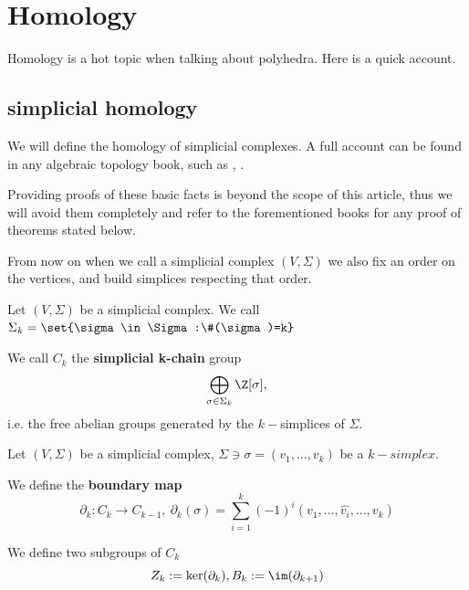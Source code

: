 \section{Homology}

Homology is a hot topic when talking about polyhedra.
Here is a quick account.

\subsection{simplicial homology}
We will define the homology of simplicial complexes. 
A full account can be found in any algebraic topology book, such as \cite{at1}, \cite{at2}.

Providing proofs of these basic facts is beyond the scope of this article, thus we will avoid them completely and 
refer to the forementioned books for any proof of theorems stated below. 

From now on when we call a simplicial complex $(V,\Sigma)$ we also fix an order on the vertices, and build simplices respecting that order.

\begin{definition}\hfill 

Let $(V,\Sigma)$ be a simplicial complex. We call $\Sigma_k=\set{\sigma\in \Sigma:\#(\sigma)=k}$

We call $C_k$ the \textbf{simplicial k-chain} group 
\[\bigoplus_{\sigma\in \Sigma_k}\Z [\sigma],\]
i.e. the free abelian groups generated by the $k-$simplices of $\Sigma$.
\end{definition}

\begin{definition}\hfill

Let $(V,\Sigma)$ be a simplicial complex, $\Sigma\ni\sigma=(v_1,...,v_k)$ be a $k-simplex$.

We define the \textbf{boundary map} 
\[\partial_k:C_k\to C_{k-1},\ \partial_k(\sigma)=\sum_{i=1}^k(-1)^i(v_1,...,\hat{v_i},...,v_k)\]

We define two subgroups of $C_k$
\[Z_k:=\ker(\partial_k), B_k:=\im(\partial_{k+1})\]
\end{definition}

